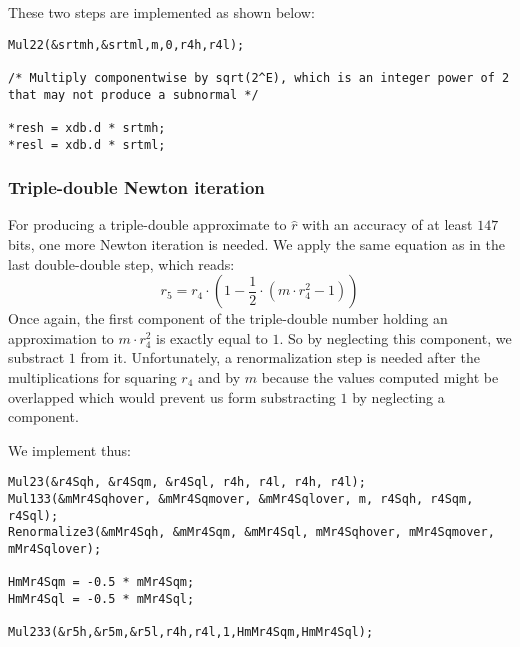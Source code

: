 These two steps are implemented as shown below:
\begin{lstlisting}[caption={Multiplication $m \cdot \hat{r}$, reconstruction},firstnumber=1]
Mul22(&srtmh,&srtml,m,0,r4h,r4l);

/* Multiply componentwise by sqrt(2^E), which is an integer power of 2 that may not produce a subnormal */

*resh = xdb.d * srtmh;
*resl = xdb.d * srtml;
\end{lstlisting}

\subsubsection{Triple-double Newton iteration}
For producing a triple-double approximate to $\hat{r}$ with an
accuracy of at least $147$ bits, one more Newton iteration is
needed. We apply the same equation as in the last double-double step,
which reads:
$$r_5 = r_4 \cdot \left( 1 - \frac{1}{2} \cdot \left( m \cdot r_4^2 -
1 \right) \right)$$ Once again, the first component of the
triple-double number holding an approximation to $m \cdot r_4^2$ is
exactly equal to $1$. So by neglecting this component, we substract $1$ from it.
Unfortunately, a renormalization step is needed after the multiplications for
squaring $r_4$ and by $m$ because the values computed might be overlapped which would prevent us
form substracting $1$ by neglecting a component.

We implement thus:
\begin{lstlisting}[caption={Newton iteration - triple-double step},firstnumber=1]
Mul23(&r4Sqh, &r4Sqm, &r4Sql, r4h, r4l, r4h, r4l);                               
Mul133(&mMr4Sqhover, &mMr4Sqmover, &mMr4Sqlover, m, r4Sqh, r4Sqm, r4Sql);        
Renormalize3(&mMr4Sqh, &mMr4Sqm, &mMr4Sql, mMr4Sqhover, mMr4Sqmover, mMr4Sqlover);
                                                                                                                 
HmMr4Sqm = -0.5 * mMr4Sqm;                                                            
HmMr4Sql = -0.5 * mMr4Sql;                                                            
                                                                                        
Mul233(&r5h,&r5m,&r5l,r4h,r4l,1,HmMr4Sqm,HmMr4Sql);                              
\end{lstlisting}

